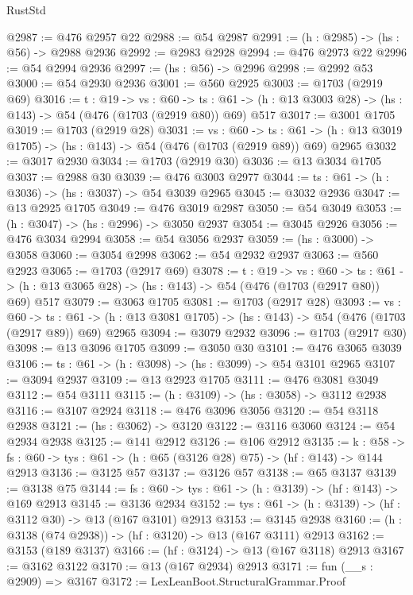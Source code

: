 \begin{lexlean}{RustStd}
\begin{coremodule}
{\begin{coremodule}
{{{{{{{{{{{{{{{{{{{{{{{{{{{{{{{{{{{{{{@2987 := @476 @2957 @22
@2988 := @54 @2987
@2991 := (h : @2985) -> (hs : @56) -> @2988 @2936
@2992 := @2983 @2928
@2994 := @476 @2973 @22
@2996 := @54 @2994 @2936
@2997 := (hs : @56) -> @2996
@2998 := @2992 @53
@3000 := @54 @2930 @2936
@3001 := @560 @2925
@3003 := @1703 (@2919 @69)
@3016 := {t : @19} ->
  {vs : @60} ->
  {ts : @61} -> (h : @13 @3003 @28) -> (hs : @143) -> @54 (@476 (@1703 (@2919 @80)) @69) @517
@3017 := @3001 @1705
@3019 := @1703 (@2919 @28)
@3031 := {vs : @60} ->
  {ts : @61} -> (h : @13 @3019 @1705) -> (hs : @143) -> @54 (@476 (@1703 (@2919 @89)) @69) @2965
@3032 := @3017 @2930
@3034 := @1703 (@2919 @30)
@3036 := @13 @3034 @1705
@3037 := @2988 @30
@3039 := @476 @3003 @2977
@3044 := {ts : @61} -> (h : @3036) -> (hs : @3037) -> @54 @3039 @2965
@3045 := @3032 @2936
@3047 := @13 @2925 @1705
@3049 := @476 @3019 @2987
@3050 := @54 @3049
@3053 := (h : @3047) -> (hs : @2996) -> @3050 @2937
@3054 := @3045 @2926
@3056 := @476 @3034 @2994
@3058 := @54 @3056 @2937
@3059 := (hs : @3000) -> @3058
@3060 := @3054 @2998
@3062 := @54 @2932 @2937
@3063 := @560 @2923
@3065 := @1703 (@2917 @69)
@3078 := {t : @19} ->
  {vs : @60} ->
  {ts : @61} -> (h : @13 @3065 @28) -> (hs : @143) -> @54 (@476 (@1703 (@2917 @80)) @69) @517
@3079 := @3063 @1705
@3081 := @1703 (@2917 @28)
@3093 := {vs : @60} ->
  {ts : @61} -> (h : @13 @3081 @1705) -> (hs : @143) -> @54 (@476 (@1703 (@2917 @89)) @69) @2965
@3094 := @3079 @2932
@3096 := @1703 (@2917 @30)
@3098 := @13 @3096 @1705
@3099 := @3050 @30
@3101 := @476 @3065 @3039
@3106 := {ts : @61} -> (h : @3098) -> (hs : @3099) -> @54 @3101 @2965
@3107 := @3094 @2937
@3109 := @13 @2923 @1705
@3111 := @476 @3081 @3049
@3112 := @54 @3111
@3115 := (h : @3109) -> (hs : @3058) -> @3112 @2938
@3116 := @3107 @2924
@3118 := @476 @3096 @3056
@3120 := @54 @3118 @2938
@3121 := (hs : @3062) -> @3120
@3122 := @3116 @3060
@3124 := @54 @2934 @2938
@3125 := @141 @2912
@3126 := @106 @2912
@3135 := {k : @58} ->
  {fs : @60} -> {tys : @61} -> (h : @65 (@3126 @28) @75) -> (hf : @143) -> @144 @2913
@3136 := @3125 @57
@3137 := @3126 @57
@3138 := @65 @3137
@3139 := @3138 @75
@3144 := {fs : @60} -> {tys : @61} -> (h : @3139) -> (hf : @143) -> @169 @2913
@3145 := @3136 @2934
@3152 := {tys : @61} -> (h : @3139) -> (hf : @3112 @30) -> @13 (@167 @3101) @2913
@3153 := @3145 @2938
@3160 := (h : @3138 (@74 @2938)) -> (hf : @3120) -> @13 (@167 @3111) @2913
@3162 := @3153 (@189 @3137)
@3166 := (hf : @3124) -> @13 (@167 @3118) @2913
@3167 := @3162 @3122
@3170 := @13 (@167 @2934) @2913
@3171 := fun (__s : @2909) => @3167
@3172 := LexLeanBoot.StructuralGrammar.Proof
}}}}}}}}}}}}}}}}}}}}}}}}}}}}}}}}}}}}}}
\end{coremodule}}
\end{coremodule}
\end{lexlean}
